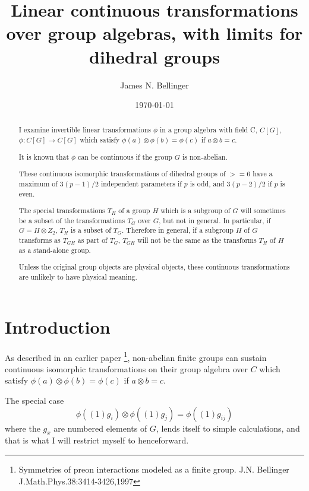 \documentclass{revtex4-1}
\begin{document}
\title{ Linear continuous transformations over group algebras, with limits for dihedral groups}
\author{James N. Bellinger}
\date{\today}


\begin{abstract}

	I examine invertible linear transformations $\phi$ in a group algebra with field C, $C[G]$, $\phi : C[G] \rightarrow C[G]$
which satisfy $\phi(a) \otimes \phi(b) = \phi(c)$ if $a \otimes b = c$.
\par It is known that $\phi$ can be continuous if the group $G$ is non-abelian.

These continuous isomorphic transformations of dihedral groups of $>=6$ have a maximum of $3(p-1)/2$ independent parameters if $p$ 
is odd, and $3(p-2)/2$ if $p$ is even.

\par The special transformations $T_H$ of a group $H$ which is a subgroup of $G$ 
will sometimes be a subset of the transformations $T_G$ over $G$,
but not in general.  In particular, if $G = H \otimes Z_2$, $T_H$
is a subset of $T_G$.  Therefore in general, if a subgroup $H$ of $G$
transforms as $T_{GH}$ as part of $T_G$, $T_{GH}$ will not be the same as
the transforms $T_H$ of $H$ as a stand-alone group.
\par Unless the original group objects are physical objects,
these continuous transformations are unlikely to have physical meaning.
\end{abstract}
\maketitle


\section{Introduction}
As described in an earlier paper \footnote{Symmetries of preon interactions modeled as a finite group. 
J.N. Bellinger J.Math.Phys.38:3414-3426,1997}, non-abelian finite groups can sustain
continuous isomorphic transformations on their group algebra over $C$ which satisfy
$\phi(a) \otimes \phi(b) = \phi(c)$ if $a \otimes b = c$.

\par  The special case
$$\phi((1)g_i) \otimes \phi((1)g_j) = \phi((1)g_{ij})$$
where the $g_x$ are numbered elements of $G$, lends itself to simple calculations, and that is
what I will restrict myself to henceforward.
\end{document}
